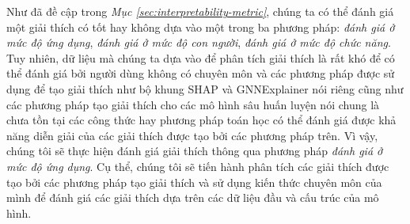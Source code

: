 Như đã đề cập trong \textit{Mục \ref{sec:interpretability-metric}}, chúng ta có thể đánh giá một giải thích có tốt hay không dựa vào một trong ba phương pháp: \textit{đánh giá ở mức độ ứng dụng}, \textit{đánh giá ở mức độ con người}, \textit{đánh giá ở mức độ chức năng}. Tuy nhiên, dữ liệu mà chúng ta dựa vào để phân tích giải thích là rất khó để có thể đánh giá bởi người dùng không có chuyên môn và các phương pháp được sử dụng để tạo giải thích như bộ khung SHAP và GNNExplainer nói riêng cũng như các phương pháp tạo giải thích cho các mô hình sâu huấn luyện nói chung là chưa tồn tại các công thức hay phương pháp toán học có thể đánh giá được khả năng diễn giải của các giải thích được tạo bởi các phương pháp trên. Vì vậy, chúng tôi sẽ thực hiện đánh giá giải thích thông qua phương pháp \textit{đánh giá ở mức độ ứng dụng}. Cụ thể, chúng tôi sẽ tiến hành phân tích các giải thích được tạo bởi các phương pháp tạo giải thích và sử dụng kiến thức chuyên môn của mình để đánh giá các giải thích dựa trên các dữ liệu đầu và cấu trúc của mô hình.


